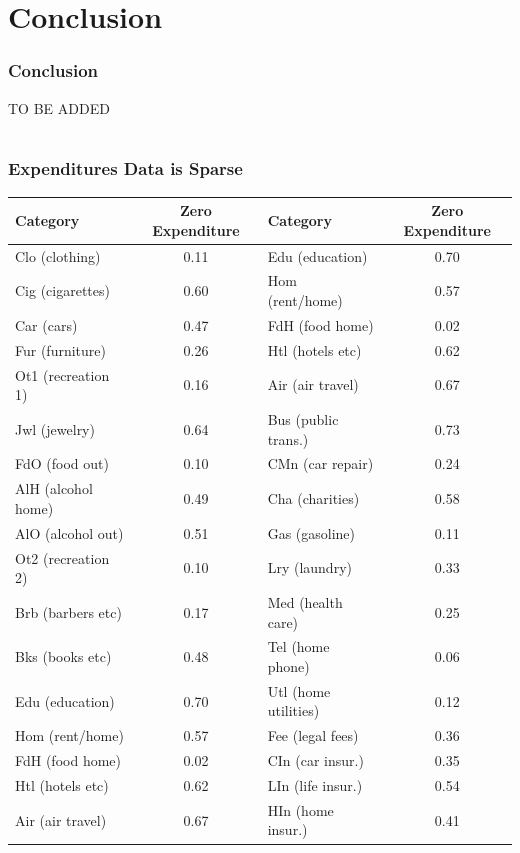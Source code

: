 \documentclass{beamer}
\begin{document}
    \section{Conclusion}
    \begin{frame} 
      \frametitle{Conclusion}
      TO BE ADDED
    \end{frame}
    \section{}
    \begin{frame}[label=zeros]
      \frametitle{Expenditures Data is Sparse}
	  \footnotesize
\begin{tabular}{|l|c|l|c|}
	\hline
\textbf{Category} & \textbf{Zero Expenditure} & \textbf{Category} & \textbf{Zero Expenditure}\\
	\hline
Clo (clothing)       & 0.11 & Edu (education)      & 0.70\\ 
	\hline              
Cig (cigarettes)     & 0.60 & Hom (rent/home)      & 0.57\\ 
	\hline             
Car (cars)           & 0.47 & FdH (food home)      & 0.02\\ 
	\hline              
Fur (furniture)      & 0.26 & Htl (hotels etc)     & 0.62\\ 
	\hline              
Ot1 (recreation 1)   & 0.16 & Air (air travel)     & 0.67\\ 
	\hline              
Jwl (jewelry)        & 0.64 & Bus (public trans.)  & 0.73\\ 
	\hline              
FdO (food out)       & 0.10 & CMn (car repair)     & 0.24\\ 
	\hline              
AlH (alcohol home)   & 0.49 & Cha (charities)      & 0.58\\ 
	\hline             
AlO (alcohol out)    & 0.51 & Gas (gasoline)       & 0.11\\ 
	\hline              
Ot2 (recreation 2)   & 0.10 & Lry (laundry)        & 0.33\\ 
	\hline              
Brb (barbers etc)    & 0.17 & Med (health care)    & 0.25\\ 
	\hline             
Bks (books etc)      & 0.48 & Tel (home phone)     & 0.06\\ 
	\hline              
Edu (education)      & 0.70 & Utl (home utilities) & 0.12\\ 
	\hline              
Hom (rent/home)      & 0.57 & Fee (legal fees)     & 0.36\\ 
	\hline              
FdH (food home)      & 0.02 & CIn (car insur.)     & 0.35\\ 
	\hline              
Htl (hotels etc)     & 0.62 & LIn (life insur.)   & 0.54 \\ 
	\hline              
Air (air travel)     & 0.67 & HIn (home insur.)   & 0.41 \\ 
	\hline
\end{tabular}

  \hyperlink{comeback}{}
\end{frame}
\end{document}

